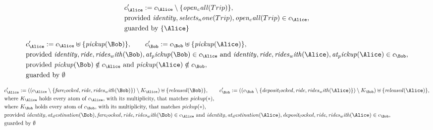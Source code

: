 \begin{align*}
&
c'_
{
\Alice
}
 := 
c_
{
\Alice
}
 \setminus 
\{
\mathit{
open_call
}
(
Trip
)
\}
,\\
&
\text{provided } 
\mathit{
identity
}
,
\mathit{
selects_none
}
(
Trip
)
,
\mathit{
open_call
}
(
Trip
)
 \in c_
{
\Alice
}
,\\
&
\text{guarded by } \{
\Alice
\}
\end{align*}

\begin{align*}
&
c'_
{
\Alice
}
 := 
c_
{
\Alice
}
 \uplus 
\{
\mathit{
pickup
}
(
\Bob
)
\}
, \qquad 
c'_
{
\Bob
}
 := 
c_
{
\Bob
}
 \uplus 
\{
\mathit{
pickup
}
(
\Alice
)
\}
,\\
&
\text{provided } 
\mathit{
identity
}
,
\mathit{
ride
}
,
\mathit{
rides_with
}
(
\Bob
)
,
\mathit{
at_pickup
}
(
\Bob
)
 \in c_
{
\Alice
}
 \text{ and } 
\mathit{
identity
}
,
\mathit{
ride
}
,
\mathit{
rides_with
}
(
\Alice
)
,
\mathit{
at_pickup
}
(
\Alice
)
 \in c_
{
\Bob
}
,\\
&
\text{provided } 
\mathit{
pickup
}
(
\Bob
)
 \notin c_
{
\Alice
}
 \text{ and } 
\mathit{
pickup
}
(
\Alice
)
 \notin c_
{
\Bob
}
,\\
&
\text{guarded by } \emptyset
\end{align*}

\begin{align*}
&
c'_
{
\Alice
}
 := 
(
(c_
{
\Alice
}
 \setminus 
\{
\mathit{
fare_locked
}
,
\mathit{
ride
}
,
\mathit{
rides_with
}
(
\Bob
)
\}
) \setminus K_
{
\Alice
}
) \uplus 
\{
\mathit{
released
}
(
\Bob
)
\}
, \qquad 
c'_
{
\Bob
}
 := 
(
(c_
{
\Bob
}
 \setminus 
\{
\mathit{
deposit_locked
}
,
\mathit{
ride
}
,
\mathit{
rides_with
}
(
\Alice
)
\}
) \setminus K_
{
\Bob
}
) \uplus 
\{
\mathit{
released
}
(
\Alice
)
\}
,\\
&
\text{where } K_
{
\Alice
}
 \text{ holds every atom of } c_
{
\Alice
}
 \text{, with its multiplicity, that matches } 
\mathit{
pickup
}
(
\ast
)
,\\
&
\text{where } K_
{
\Bob
}
 \text{ holds every atom of } c_
{
\Bob
}
 \text{, with its multiplicity, that matches } 
\mathit{
pickup
}
(
\ast
)
,\\
&
\text{provided } 
\mathit{
identity
}
,
\mathit{
at_destination
}
(
\Bob
)
,
\mathit{
fare_locked
}
,
\mathit{
ride
}
,
\mathit{
rides_with
}
(
\Bob
)
 \in c_
{
\Alice
}
 \text{ and } 
\mathit{
identity
}
,
\mathit{
at_destination
}
(
\Alice
)
,
\mathit{
deposit_locked
}
,
\mathit{
ride
}
,
\mathit{
rides_with
}
(
\Alice
)
 \in c_
{
\Bob
}
,\\
&
\text{guarded by } \emptyset
\end{align*}
